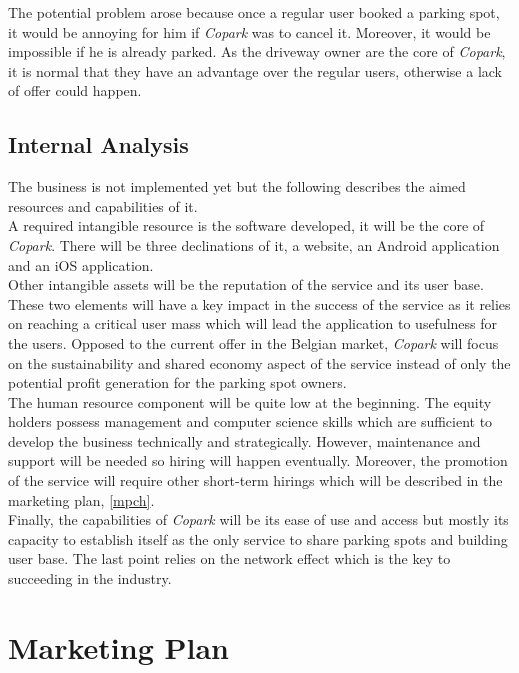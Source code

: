 \documentclass[12pt,a4paper,oneside]{book}
\newcommand{\bp}{\textit{Copark}}
\begin{document}
The potential problem arose because once a regular user booked a parking spot, it would be annoying for him if \bp{} was to cancel it. Moreover, it would be impossible if he is already parked. As the driveway owner are the core of \bp{}, it is normal that they have an advantage over the regular users, otherwise a lack of offer could happen.

\section{Internal Analysis}
The business is not implemented yet but the following describes the aimed resources and capabilities of it.\\

A required intangible resource is the software developed, it will be the core of \bp{}. There will be three declinations of it, a website, an Android application and an iOS application.\\

Other intangible assets will be the reputation of the service and its user base. These two elements will have a key impact in the success of the service as it relies on reaching a critical user mass which will lead the application to usefulness for the users. Opposed to the current offer in the Belgian market, \bp{} will focus on the sustainability and shared economy aspect of the service instead of only the potential profit generation for the parking spot owners.\\

The human resource component will be quite low at the beginning. The equity holders possess management and computer science skills which are sufficient to develop the business technically and strategically. However, maintenance and support will be needed so hiring will happen eventually. Moreover, the promotion of the service will require other short-term hirings which will be described in the marketing plan, \autoref{mpch}.\\

Finally, the capabilities of \bp{} will be its ease of use and access but mostly its capacity to establish itself as the only service to share parking spots and building user base. The last point relies on the network effect which is the key to succeeding in the industry.

\chapter{Marketing Plan}
\label{mpch}
\end{document}
